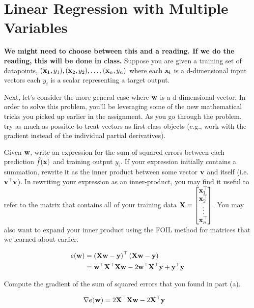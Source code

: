 \documentclass[assignment01_Solutions]{subfiles}
\begin{document}
\section{Linear Regression with Multiple Variables}
\textbf{We might need to choose between this and a reading. If we do the reading, this will be done in class.}
Suppose you are given a training set of datapoints, $(\mathbf{x_1}, y_1), (\mathbf{x}_2, y_2), \ldots, (\mathbf{x}_n, y_n)$ where each $\mathbf{x_i}$ is a d-dimensional input vectors each $y_i$ is a scalar representing a target output.
\begin{exercise}[60 minutes]
Next, let's consider the more general case where $\mathbf{w}$ is a d-dimensional vector.  In order to solve this problem, you'll be leveraging some of the new mathematical tricks you picked up earlier in the assignment.  As you go through the problem, try as much as possible to treat vectors as first-class objects (e.g., work with the gradient instead of the individual partial derivatives).
\bes
\item Given $\mathbf{w}$, write an expression for the sum of squared errors between each prediction $\hat{f}(\mathbf{x})$ and training output $y_i$.  If your expression initially contains a summation, rewrite it as the inner product between some vector $\mathbf{v}$ and itself (i.e. $\mathbf{v}^\top \mathbf{v}$).  In rewriting your expression as an inner-product, you may find it useful to refer to the matrix that contains all of your training data $\mathbf{X} = \begin{bmatrix} \mathbf{x}_1^\top \\ \mathbf{x}_2^\top \\ \vdots \\ \mathbf{x}_n^\top \end{bmatrix}$.  You may also want to expand your inner product using the FOIL method for matrices that we learned about earlier.

\begin{boxedsolution}
\begin{align}
e(\mathbf{w}) &= \left ( \mathbf{X} \mathbf{w} - \mathbf{y} \right)^\top  \left ( \mathbf{X} \mathbf{w} - \mathbf{y} \right) \\
&= \mathbf{w}^\top \mathbf{X}^\top \mathbf{X} \mathbf{w} - 2 \mathbf{w}^\top \mathbf{X}^\top \mathbf{y} + \mathbf{y}^\top \mathbf{y}
\end{align}
\end{boxedsolution}
\fi

\item Compute the gradient of the sum of squared errors that you found in part (a).
\begin{boxedsolution}
\begin{align}
\nabla e(\mathbf{w})  &= 2 \mathbf{X}^\top \mathbf{X} \mathbf{w} - 2 \mathbf{X}^\top \mathbf{y}
\end{align}
\end{boxedsolution}
\fi


\end{exercise}
\end{document}
